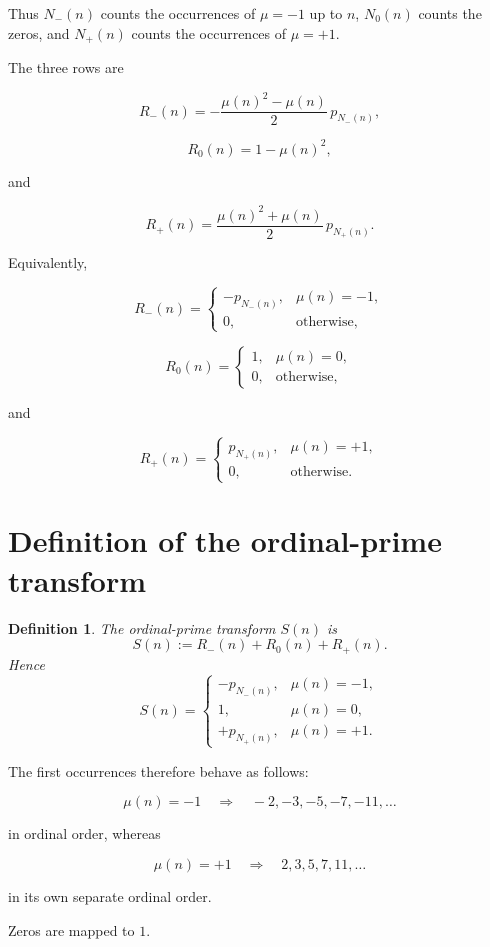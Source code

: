 \documentclass[11pt]{amsart}
\newtheorem{definition}{Definition}[section]
\newcommand{\mob}{\mu}
\begin{document}
Thus $N_-(n)$ counts the occurrences of $\mob=-1$ up to $n$, $N_0(n)$ counts the zeros, and $N_+(n)$ counts the occurrences of $\mob=+1$.

The three rows are

\[
R_-(n)
=
-\frac{\mob(n)^2-\mob(n)}2\,p_{N_-(n)},
\]

\[
R_0(n)
=
1-\mob(n)^2,
\]

and

\[
R_+(n)
=
\frac{\mob(n)^2+\mob(n)}2\,p_{N_+(n)}.
\]

Equivalently,

\[
R_-(n)=
\begin{cases}
-p_{N_-(n)},&\mob(n)=-1,\\
0,&\text{otherwise},
\end{cases}
\]

\[
R_0(n)=
\begin{cases}
1,&\mob(n)=0,\\
0,&\text{otherwise},
\end{cases}
\]

and

\[
R_+(n)=
\begin{cases}
p_{N_+(n)},&\mob(n)=+1,\\
0,&\text{otherwise}.
\end{cases}
\]

\section{Definition of the ordinal-prime transform}

\begin{definition}
The ordinal-prime transform $S(n)$ is
\[
S(n):=R_-(n)+R_0(n)+R_+(n).
\]
Hence
\[
\boxed{
S(n)=
\begin{cases}
-p_{N_-(n)},&\mob(n)=-1,\\[1mm]
1,&\mob(n)=0,\\[1mm]
+p_{N_+(n)},&\mob(n)=+1.
\end{cases}
}
\]
\end{definition}

The first occurrences therefore behave as follows:

\[
\mob(n)=-1
\quad\Longrightarrow\quad
-2,-3,-5,-7,-11,\ldots
\]

in ordinal order, whereas

\[
\mob(n)=+1
\quad\Longrightarrow\quad
2,3,5,7,11,\ldots
\]

in its own separate ordinal order.

Zeros are mapped to $1$.
\end{document}
